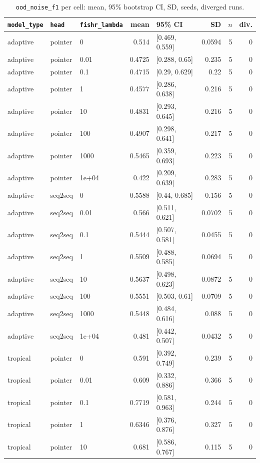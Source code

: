 \documentclass[10pt]{article}
\begin{document}
{\small
\begin{longtable}{lllrlrrr}
\caption{\texttt{ood\_noise\_f1} per cell: mean, 95\% bootstrap CI, SD, seeds, diverged runs.}\label{tab:summary-ood_noise_f1}\\
\toprule
\texttt{model\_type} & \texttt{head} & \texttt{fishr\_lambda} & mean & 95\% CI & SD & $n$ & div.\\
\midrule
\endhead
adaptive & pointer & 0 & 0.514 & [0.469, 0.559] & 0.0594 & 5 & 0\\
adaptive & pointer & 0.01 & 0.4725 & [0.288, 0.65] & 0.235 & 5 & 0\\
adaptive & pointer & 0.1 & 0.4715 & [0.29, 0.629] & 0.22 & 5 & 0\\
adaptive & pointer & 1 & 0.4577 & [0.286, 0.638] & 0.216 & 5 & 0\\
adaptive & pointer & 10 & 0.4831 & [0.293, 0.645] & 0.216 & 5 & 0\\
adaptive & pointer & 100 & 0.4907 & [0.298, 0.641] & 0.217 & 5 & 0\\
adaptive & pointer & 1000 & 0.5465 & [0.359, 0.693] & 0.223 & 5 & 0\\
adaptive & pointer & 1e+04 & 0.422 & [0.209, 0.639] & 0.283 & 5 & 0\\
adaptive & seq2seq & 0 & 0.5588 & [0.44, 0.685] & 0.156 & 5 & 0\\
adaptive & seq2seq & 0.01 & 0.566 & [0.511, 0.621] & 0.0702 & 5 & 0\\
adaptive & seq2seq & 0.1 & 0.5444 & [0.507, 0.581] & 0.0455 & 5 & 0\\
adaptive & seq2seq & 1 & 0.5509 & [0.488, 0.585] & 0.0694 & 5 & 0\\
adaptive & seq2seq & 10 & 0.5637 & [0.498, 0.623] & 0.0872 & 5 & 0\\
adaptive & seq2seq & 100 & 0.5551 & [0.503, 0.61] & 0.0709 & 5 & 0\\
adaptive & seq2seq & 1000 & 0.5448 & [0.484, 0.616] & 0.088 & 5 & 0\\
adaptive & seq2seq & 1e+04 & 0.481 & [0.442, 0.507] & 0.0432 & 5 & 0\\
tropical & pointer & 0 & 0.591 & [0.392, 0.749] & 0.239 & 5 & 0\\
tropical & pointer & 0.01 & 0.609 & [0.332, 0.886] & 0.366 & 5 & 0\\
tropical & pointer & 0.1 & 0.7719 & [0.581, 0.963] & 0.244 & 5 & 0\\
tropical & pointer & 1 & 0.6346 & [0.376, 0.876] & 0.327 & 5 & 0\\
tropical & pointer & 10 & 0.681 & [0.586, 0.767] & 0.115 & 5 & 0\\

\end{longtable}}
\end{document}
